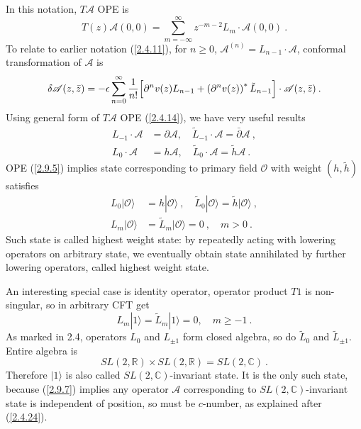 In this notation, $T\mathscr{A}$ OPE is    
\begin{equation}\label{2.9.5}
	T(z) \mathscr{A}(0,0)=\sum_{m=-\infty}^{\infty} z^{-m-2} L_{m} \cdot \mathscr{A}(0,0) \:.
\end{equation}
To relate to earlier notation (\ref{2.4.11}), for $n \geq 0$, $\mathscr{A}^{(n)}=L_{n-1} \cdot \mathscr{A}$, conformal transformation of $\mathscr{A}$ is    
\begin{equation}
	\delta \mathscr{A}(z, \bar{z})=-\epsilon \sum_{n=0}^{\infty} \frac{1}{n !}\Bigl[\partial^{n} v(z) L_{n-1}+\left(\partial^{n} v(z)\right)^{*} \tilde{L}_{n-1}\Bigr] \cdot \mathscr{A}(z, \bar{z}) \:.
	\label{2.9.6}
\end{equation}
Using general form of $T\mathscr{A}$ OPE (\ref{2.4.14}), we have very useful results    
\begin{subequations}\label{2.9.7}
	\begin{align}
		L_{-1} \cdot \mathscr{A}&=\partial \mathscr{A}, \quad \tilde{L}_{-1} \cdot \mathscr{A}=\bar{\partial} \mathscr{A} \:, \label{2.9.7a} \\
		L_{0} \cdot \mathscr{A}&=h \mathscr{A}, \quad \tilde{L}_{0} \cdot \mathscr{A}=\tilde{h} \mathscr{A} \:.\label{2.9.7b}
	\end{align}
\end{subequations}
OPE (\ref{2.9.5}) implies state corresponding to primary field $\mathcal{O}$ with weight $(h, \tilde{h})$ satisfies    
\begin{subequations} \label{2.9.8}
	\begin{align}
		L_{0}|\mathcal{O}\rangle&=h|\mathcal{O}\rangle \:, \quad \tilde{L}_{0}|\mathcal{O}\rangle=\tilde{h}|\mathcal{O}\rangle \:, \label{2.9.8a} \\
		L_{m}|\mathcal{O}\rangle&=\tilde{L}_{m}|\mathcal{O}\rangle=0\:, \quad m>0 \:.
		\label{2.9.8b}
	\end{align}
\end{subequations}
Such state is called highest weight state: by repeatedly acting with lowering operators on arbitrary state, we eventually obtain state annihilated by further lowering operators, called highest weight state.    

An interesting special case is identity operator, operator product $T1$ is non-singular, so in arbitrary CFT get    
\begin{equation}
	L_{m}|1\rangle=\tilde{L}_{m}|1\rangle=0, \quad m \geq-1 \:.
	\label{2.9.9}
\end{equation}
As marked in 2.4, operators $L_{0}$ and $L_{\pm 1}$ form closed algebra, so do $\tilde{L}_{0}$ and $\tilde{L}_{\pm 1}$. Entire algebra is    
\begin{equation}
	SL(2,\mathds{R})\times SL(2,\mathds{R})= S L(2, \mathds{C}) \:. \label{2.9.10}
\end{equation}
Therefore $|1\rangle$ is also called $SL(2, \mathds{C})$-invariant state.    
It is the only such state, because (\ref{2.9.7}) implies any operator $\mathscr{A}$ corresponding to $SL(2, \mathds{C})$-invariant state is independent of position, so must be $c$-number, as explained after (\ref{2.4.24}).    

